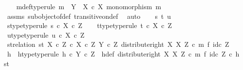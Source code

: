 \begin{isabellebody}
\isamarkupfalse%
\isanewline
\ \ \isamarkupfalse%
\ m{\isacharunderscore}{\kern0pt}def{\isacharbrackleft}{\kern0pt}type{\isacharunderscore}{\kern0pt}rule{\isacharbrackright}{\kern0pt}{\isacharcolon}{\kern0pt}\ {\isachardoublequoteopen}m\ {\isacharcolon}{\kern0pt}\ Y\ {\isasymrightarrow}\ X\ {\isasymtimes}\isactrlsub c\ X{\isachardoublequoteclose}\ {\isachardoublequoteopen}monomorphism\ m{\isachardoublequoteclose}\isanewline
\ \ \ \ \isamarkupfalse%
\ assms\ subobject{\isacharunderscore}{\kern0pt}of{\isacharunderscore}{\kern0pt}def{}\ transitive{\isacharunderscore}{\kern0pt}on{\isacharunderscore}{\kern0pt}def\ \isamarkupfalse%
\ auto\isanewline
\isanewline
\ \ \isamarkupfalse%
\ s\ t\ u\isanewline
\ \ \isamarkupfalse%
\ s{\isacharunderscore}{\kern0pt}type{\isacharbrackleft}{\kern0pt}type{\isacharunderscore}{\kern0pt}rule{\isacharbrackright}{\kern0pt}{\isacharcolon}{\kern0pt}\ {\isachardoublequoteopen}s\ {\isasymin}\isactrlsub c\ X\ {\isasymtimes}\isactrlsub c\ Z{\isachardoublequoteclose}\isanewline
\ \ \isamarkupfalse%
\ t{\isacharunderscore}{\kern0pt}type{\isacharbrackleft}{\kern0pt}type{\isacharunderscore}{\kern0pt}rule{\isacharbrackright}{\kern0pt}{\isacharcolon}{\kern0pt}\ {\isachardoublequoteopen}t\ {\isasymin}\isactrlsub c\ X\ {\isasymtimes}\isactrlsub c\ Z{\isachardoublequoteclose}\isanewline
\ \ \isamarkupfalse%
\ u{\isacharunderscore}{\kern0pt}type{\isacharbrackleft}{\kern0pt}type{\isacharunderscore}{\kern0pt}rule{\isacharbrackright}{\kern0pt}{\isacharcolon}{\kern0pt}\ {\isachardoublequoteopen}u\ {\isasymin}\isactrlsub c\ X\ {\isasymtimes}\isactrlsub c\ Z{\isachardoublequoteclose}\isanewline
\isanewline
\ \ \isamarkupfalse%
\ st{\isacharunderscore}{\kern0pt}relation{\isacharcolon}{\kern0pt}\ {\isachardoublequoteopen}{\isasymlangle}s{\isacharcomma}{\kern0pt}t{\isasymrangle}\ {\isasymin}\isactrlbsub {\isacharparenleft}{\kern0pt}X\ {\isasymtimes}\isactrlsub c\ Z{\isacharparenright}{\kern0pt}\ {\isasymtimes}\isactrlsub c\ X\ {\isasymtimes}\isactrlsub c\ Z\isactrlesub \ {\isacharparenleft}{\kern0pt}Y\ {\isasymtimes}\isactrlsub c\ Z{\isacharcomma}{\kern0pt}\ distribute{\isacharunderscore}{\kern0pt}right\ X\ X\ Z\ {\isasymcirc}\isactrlsub c\ m\ {\isasymtimes}\isactrlsub f\ id\isactrlsub c\ Z{\isacharparenright}{\kern0pt}{\isachardoublequoteclose}\isanewline
\ \ \isamarkupfalse%
\ \isamarkupfalse%
\ h\ \ h{\isacharunderscore}{\kern0pt}type{\isacharbrackleft}{\kern0pt}type{\isacharunderscore}{\kern0pt}rule{\isacharbrackright}{\kern0pt}{\isacharcolon}{\kern0pt}\ {\isachardoublequoteopen}h\ {\isasymin}\isactrlsub c\ Y\ {\isasymtimes}\isactrlsub c\ Z{\isachardoublequoteclose}\ \ h{\isacharunderscore}{\kern0pt}def{\isacharcolon}{\kern0pt}\ {\isachardoublequoteopen}{\isacharparenleft}{\kern0pt}distribute{\isacharunderscore}{\kern0pt}right\ X\ X\ Z\ {\isasymcirc}\isactrlsub c\ m\ {\isasymtimes}\isactrlsub f\ id\isactrlsub c\ Z{\isacharparenright}{\kern0pt}\ {\isasymcirc}\isactrlsub c\ h\ {\isacharequal}{\kern0pt}\ {\isasymlangle}s{\isacharcomma}{\kern0pt}t{\isasymrangle}{\isachardoublequoteclose}\isanewline

\end{isabellebody}
